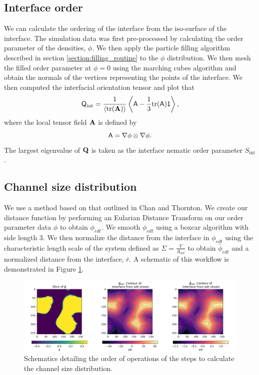 \subsection{Interface order}
\label{section:interface_order}

We can calculate the ordering of the interface from the iso-surface of the interface. The simulation data was first pre-processed by calculating the 
order parameter of the densities, $\phi$. We then apply the particle filling algorithm described in section \ref{section:filling_routine} 
to the $\phi$ distribution. We then mesh the filled order parameter at $\phi = 0$ using the marching cubes algorithm and obtain the normals of the
vertices representing the points of the interface. We then computed the interfacial orientation tensor and plot that 
%
\begin{equation}
\tens{Q}_{\text{int}} = \frac{1}{\langle \mathrm{tr}(\tens{A}) \rangle} 
\left\langle \tens{A} - \frac{1}{3} \mathrm{tr}(\tens{A}) \mathsf{1} \right\rangle ,
\end{equation}
%
where the local tensor field $\tens{A}$ is defined by
%
\begin{equation}
\tens{A} = \nabla\phi\otimes\nabla\phi .
\end{equation}
%
The largest eigenvalue of $\tens{Q}$ is taken as the
interface nematic order parameter $S_{\text{int}}$.

\subsection{Channel size distribution}
\label{section:channel_size_distribution}

We use a method based on that outlined in Chan and Thornton. We create our distance function by performing an Eularian Distance Transform on 
our order parameter data $\phi$ to obtain $\phi_{edt}$. \cite{chan_channel_2012} We smooth $\phi_{edt}$ using a boxcar algorithm with side length 3. 
We then normalize the distance from the interface in $\phi_{edt}$ using the characteristic length scale of the system defined as $\Sigma = \frac{V}{A_{int}}$
to obtain $\bar{\phi}_{edt}$ and a normalized distance from the interface, $\bar{r}$. A schematic of this workflow is demonstrated in Figure \ref{fig:csd_prep_viz}.

\begin{figure}
    \centering
    \includegraphics[scale = 0.4]{figures/analysis/csd_prep.png}
    \caption{Schematics detailing the order of operations of the steps to calculate the channel size distribution.}
    \label{fig:csd_prep_viz}
\end{figure}

